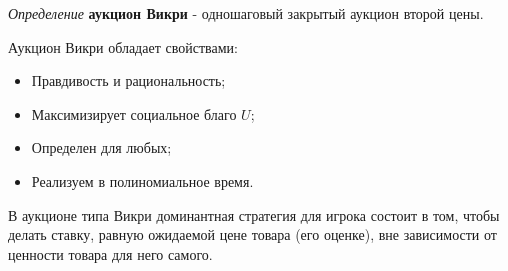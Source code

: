
\textit{Определение} \textbf{аукцион Викри} - одношаговый закрытый аукцион второй цены.

Аукцион Викри обладает свойствами:

\begin{itemize}
    \item Правдивость и рациональность;
    \item Максимизирует социальное благо $U$;
    \item Определен для любых;
    \item Реализуем в полиномиальное время.
\end{itemize}


В аукционе типа Викри доминантная стратегия для игрока состоит в том, чтобы делать ставку, равную ожидаемой цене товара (его оценке), вне зависимости от ценности товара для него самого.




